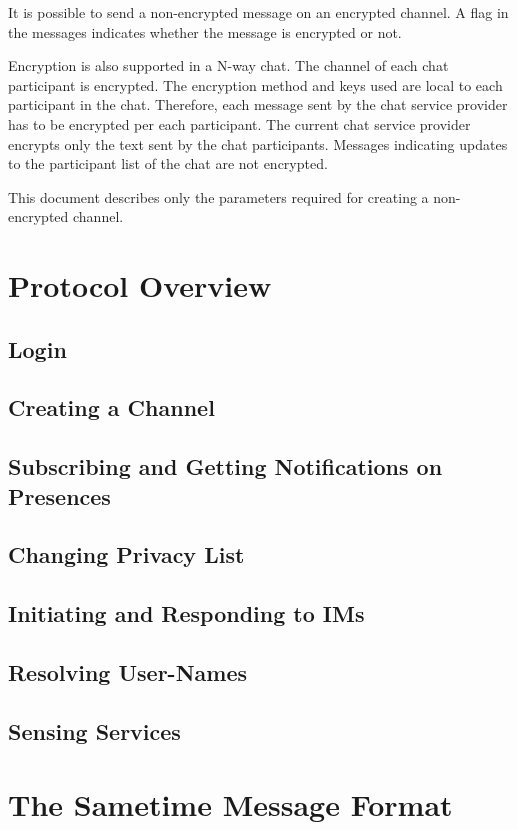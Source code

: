 \documentclass[titlepage,oneside]{book}
\begin{document}
\par{} It is possible to send a non-encrypted message on an encrypted
channel. A flag in the messages indicates whether the message is
encrypted or not.

\par{} Encryption is also supported in a N-way chat. The channel of
each chat participant is encrypted. The encryption method and keys
used are local to each participant in the chat. Therefore, each
message sent by the chat service provider has to be encrypted per each
participant. The current chat service provider encrypts only the text
sent by the chat participants. Messages indicating updates to the
participant list of the chat are not encrypted.

\par{} This document describes only the parameters required for
creating a non-encrypted channel.

\chapter{Protocol Overview}
\section{Login}
\section{Creating a Channel}
\section{Subscribing and Getting Notifications on Presences}
\section{Changing Privacy List}
\section{Initiating and Responding to IMs}
\section{Resolving User-Names}
\section{Sensing Services}

\chapter{The Sametime Message Format}
\end{document}
